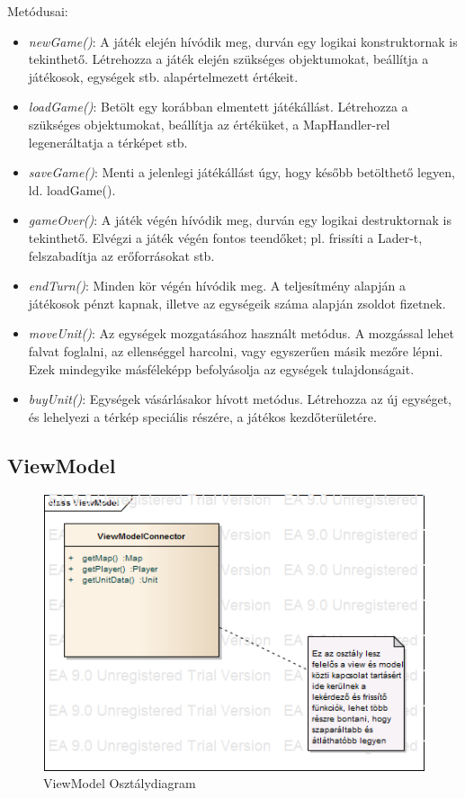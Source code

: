 \documentclass[a4paper,12pt]{report}
\begin{document}
Metódusai:
\begin{itemize}
\item \textit{newGame()}: A játék elején hívódik meg, durván egy logikai konstruktornak is tekinthető. Létrehozza a játék elején szükséges objektumokat, beállítja a játékosok, egységek stb. alapértelmezett értékeit.
\item \textit{loadGame()}: Betölt egy korábban elmentett játékállást. Létrehozza a szükséges objektumokat, beállítja az értéküket, a MapHandler-rel legeneráltatja a térképet stb.
\item \textit{saveGame()}: Menti a jelenlegi játékállást úgy, hogy később betölthető legyen, ld. loadGame().
\item \textit{gameOver()}: A játék végén hívódik meg, durván egy logikai destruktornak is tekinthető. Elvégzi a játék végén fontos teendőket; pl. frissíti a Lader-t, felszabadítja az erőforrásokat stb.
\item \textit{endTurn()}: Minden kör végén hívódik meg. A teljesítmény alapján a játékosok pénzt kapnak, illetve az egységeik száma alapján zsoldot fizetnek.
\item \textit{moveUnit()}: Az egységek mozgatásához használt metódus. A mozgással lehet falvat foglalni, az ellenséggel harcolni, vagy egyszerűen másik mezőre lépni. Ezek mindegyike másféleképp befolyásolja az egységek tulajdonságait.
\item \textit{buyUnit()}: Egységek vásárlásakor hívott metódus. Létrehozza az új egységet, és lehelyezi a térkép speciális részére, a játékos kezdőterületére.
\end{itemize}

\subsection{ViewModel}

\begin{figure}[hbtp]
\centering
\includegraphics[width=1\textwidth]{ViewModelClass.png}
\caption{ViewModel Osztálydiagram}
\label{fig:vmc}
\end{figure}
\end{document}
